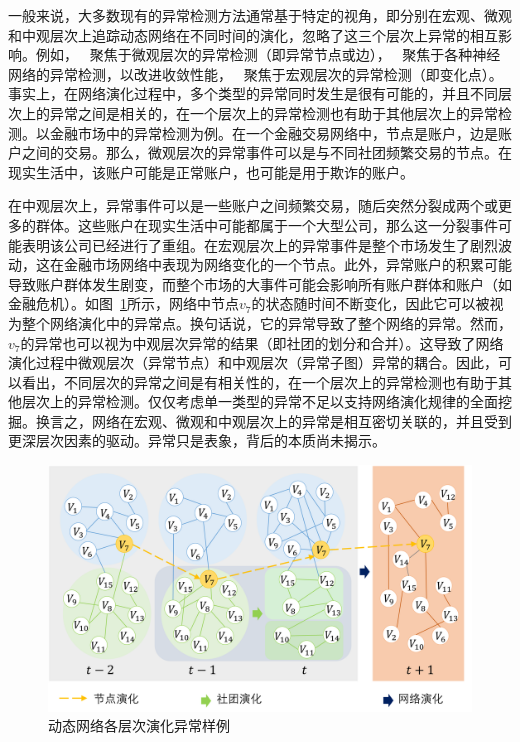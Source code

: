 一般来说，大多数现有的异常检测方法通常基于特定的视角，即分别在宏观、微观和中观层次上追踪动态网络在不同时间的演化，忽略了这三个层次上异常的相互影响。例如，~\cite{hassanzadeh2013semi,heard2010bayesian} 聚焦于微观层次的异常检测（即异常节点或边），~\cite{8648298,7953678,XIAO2019124} 聚焦于各种神经网络的异常检测，以改进收敛性能，~\cite{hulovatyy2016scout,cheung2020simultaneous} 聚焦于宏观层次的异常检测（即变化点）。事实上，在网络演化过程中，多个类型的异常同时发生是很有可能的，并且不同层次上的异常之间是相关的，在一个层次上的异常检测也有助于其他层次上的异常检测。以金融市场中的异常检测为例。在一个金融交易网络中，节点是账户，边是账户之间的交易。那么，微观层次的异常事件可以是与不同社团频繁交易的节点。在现实生活中，该账户可能是正常账户，也可能是用于欺诈的账户。


在中观层次上，异常事件可以是一些账户之间频繁交易，随后突然分裂成两个或更多的群体。这些账户在现实生活中可能都属于一个大型公司，那么这一分裂事件可能表明该公司已经进行了重组。在宏观层次上的异常事件是整个市场发生了剧烈波动，这在金融市场网络中表现为网络变化的一个节点。此外，异常账户的积累可能导致账户群体发生剧变，而整个市场的大事件可能会影响所有账户群体和账户（如金融危机）。如图~\ref{fig:example}所示，网络中节点$v_{7}$的状态随时间不断变化，因此它可以被视为整个网络演化中的异常点。换句话说，它的异常导致了整个网络的异常。然而，$v_{7}$的异常也可以视为中观层次异常的结果（即社团的划分和合并）。这导致了网络演化过程中微观层次（异常节点）和中观层次（异常子图）异常的耦合。因此，可以看出，不同层次的异常之间是有相关性的，在一个层次上的异常检测也有助于其他层次上的异常检测。仅仅考虑单一类型的异常不足以支持网络演化规律的全面挖掘。换言之，网络在宏观、微观和中观层次上的异常是相互密切关联的，并且受到更深层次因素的驱动。异常只是表象，背后的本质尚未揭示。

\begin{figure}[htbp]
    \centering
    \includegraphics[width=.85\linewidth,trim=0.1in 0.5in 0.1in 0.1in]{figures/chap05/chap5motivation.png}
    \caption{动态网络各层次演化异常样例}
    \label{fig:example}
\end{figure} 





